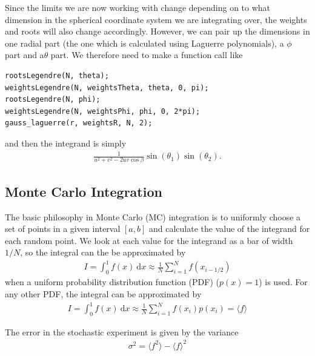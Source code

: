 \documentclass[twoside, 11pt]{article}
\renewcommand{\d}{\mathrm{d}}
\begin{document}
			Since the limits we are now working with change depending on to what dimension in the spherical coordinate system we are integrating over, the weights and roots will also change accordingly. However, we can pair up the dimensions in one radial part (the one which is calculated using Laguerre polynomials), a $\phi$ part and a$\theta$ part. We therefore need to make a function call like
			\begin{lstlisting}
rootsLegendre(N, theta);
weightsLegendre(N, weightsTheta, theta, 0, pi);
rootsLegendre(N, phi);
weightsLegendre(N, weightsPhi, phi, 0, 2*pi);
gauss_laguerre(r, weightsR, N, 2);
			\end{lstlisting}
			
			and then the integrand is simply
			\begin{align}
				\frac{1}{u^2 + v^2 - 2uv \cos\beta} \sin(\theta_1) \sin(\theta_2).
			\end{align}
		
		
	\subsection{Monte Carlo Integration}
		The basic philosophy in Monte Carlo (MC) integration is to uniformly choose a set of points in a given interval $[a, b]$ and calculate the value of the integrand for each random point. We look at each value for the integrand as a bar of width $1/N$, so the integral can the be approximated by
		\begin{align}
			I = \int_{0}^{1} f(x) \ \d x \approx \frac{1}{N} \sum_{i=1}^N f(x_{i-1/2})
		\end{align}
		when a uniform probability distribution function (PDF) ($p(x)=1$) is used. For any other PDF, the integral can be approximated by
		\begin{align}
			I = \int_{0}^{1} f(x) \ \d x \approx \frac{1}{N} \sum_{i=1}^N f(x_i)p(x_i) = \langle f \rangle 
		\end{align}
		
		The error in the stochastic experiment is given by the variance
		\begin{align}
			\sigma^2 = \langle f^2 \rangle - \langle f \rangle ^2
		\end{align}
		
		
		
				 
\end{document}

